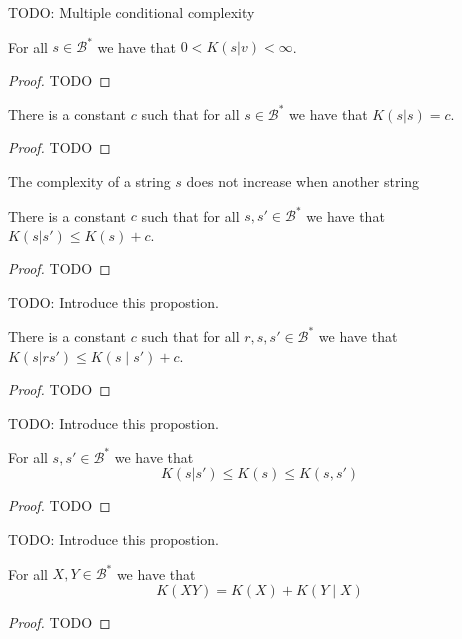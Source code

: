 {\color{red} TODO: Multiple conditional complexity}

\begin{proposition}
For all $s\in\mathcal{B}^{\ast}$ we have that $0 < K(s | v) < \infty$.
\end{proposition}
\begin{proof}
{\color{red} TODO}
\end{proof}


\begin{proposition}
There is a constant $c$ such that for all $s\in\mathcal{B}^{\ast}$ we have that $K(s | s ) = c$.
\end{proposition}
\label{prop:self_conditional}
\begin{proof}
{\color{red} TODO}
\end{proof}

The complexity of a string $s$ does not increase when another string

\begin{proposition}
\label{prop:kolmogorov_conditional}
There is a constant $c$ such that for all $s, s'\in\mathcal{B}^{\ast}$ we have that $K(s | s' ) \leq K(s) + c$.
\end{proposition}
\begin{proof}
{\color{red} TODO}
\end{proof}

{\color{red} TODO: Introduce this propostion.}

\begin{proposition}
\label{prop:kolmogorov_joint_conditional}
There is a constant $c$ such that for all $r ,s, s'\in\mathcal{B}^{\ast}$ we have that $K(s | rs' ) \leq K(s \mid s') + c$.
\end{proposition}
\begin{proof}
{\color{red} TODO}
\end{proof}


{\color{red} TODO: Introduce this propostion.}

\begin{proposition}
\label{prop:kolmogorov_relations}
For all $s, s'\in\mathcal{B}^{\ast}$ we have that
\[
K(s | s' ) \leq K(s) \leq K(s, s')
\]
\end{proposition}
\begin{proof}
{\color{red} TODO}
\end{proof}

{\color{red} TODO: Introduce this propostion.}

\begin{proposition}
\label{prop:kolmogorov_relations}
For all $X, Y\in\mathcal{B}^{\ast}$ we have that
\[
K(XY) = K(X) + K(Y \mid X)
\]
\end{proposition}
\begin{proof}
{\color{red} TODO}
\end{proof}




